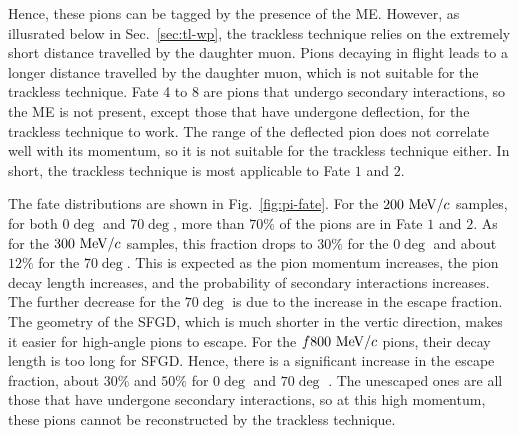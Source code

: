           Hence, these pions can be tagged by the presence of the ME.
          However, as illusrated below in Sec.~\ref{sec:tl-wp}, the trackless technique relies on the extremely short distance travelled by the daughter muon.
          Pions decaying in flight leads to a longer distance travelled by the daughter muon, which is not suitable for the trackless technique.
          Fate 4 to 8 are pions that undergo secondary interactions, so the ME is not present, except those that have undergone deflection, for the trackless technique to work.
          The range of the deflected pion does not correlate well with its momentum, so it is not suitable for the trackless technique either. 
          In short, the trackless technique is most applicable to Fate $1$ and $2$.

          The fate distributions are shown in Fig.~\ref{fig:pi-fate}.
          For the $200~\textrm{MeV}/c$ samples, for both $0\deg$ and $70\deg$, more than $70\%$ of the pions are in Fate $1$ and $2$.
          As for the $300~\textrm{MeV}/c$ samples, this fraction drops to $30\%$ for the $0\deg$ and about $12\%$ for the $70\deg$.
          This is expected as the pion momentum increases, the pion decay length increases, and the probability of secondary interactions increases.
          The further decrease for the $70\deg$ is due to the increase in the escape fraction.
          The geometry of the SFGD, which is much shorter in the vertic direction, makes it easier for high-angle pions to escape.
          For the $f800~\textrm{MeV}/c$ pions, their decay length is too long for SFGD.
          Hence, there is a significant increase in the escape fraction, about $30\%$ and $50\%$ for $0\deg$ and $70\deg$ .
          The unescaped ones are all those that have undergone secondary interactions, so at this high momentum, these pions cannot be reconstructed by the trackless technique.
